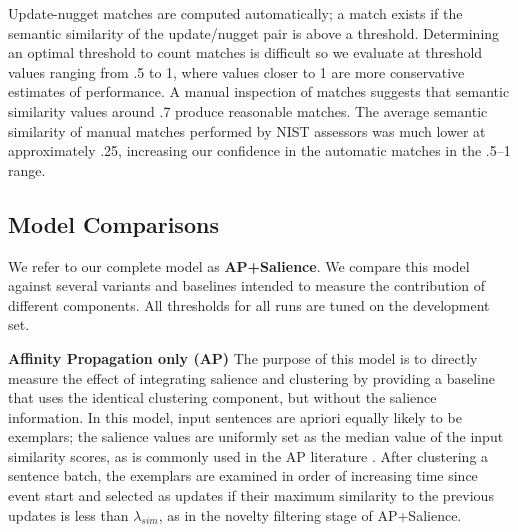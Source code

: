 Update-nugget matches are computed automatically; a
match exists if the semantic similarity of the update/nugget pair is above 
a threshold.
Determining an optimal threshold to count matches is difficult so 
we evaluate at 
threshold values ranging
from .5 to 1, where values closer to 1 are more conservative estimates of
performance.
A manual inspection of matches 
suggests that semantic similarity values around .7 produce reasonable matches.
The average semantic similarity of manual matches performed 
by NIST assessors was much lower at approximately .25, increasing
our confidence in the automatic matches in the .5--1 range.


\subsection{Model Comparisons}
We refer to our complete model as \textbf{AP+Salience}.  We compare this model against several variants and baselines intended to measure the contribution of different components. All thresholds
for all runs are tuned on the development set.

\textbf{Affinity Propagation only (AP) } The purpose of this model
is to directly measure the effect of integrating salience and clustering by providing a baseline that uses the identical 
clustering component, but without the salience information.
In this model, input sentences are apriori equally likely to be exemplars;
the salience values are uniformly set as the median value of the 
input similarity scores, as is commonly used in the AP literature \cite{frey2007clustering}.
After clustering a sentence batch, the exemplars are examined in order
of increasing time since event start and selected as updates if their
maximum similarity to the previous updates is less than $\lambda_{sim}$,
as in the novelty filtering stage of AP+Salience.

